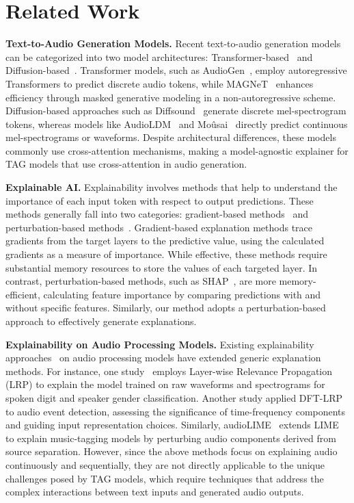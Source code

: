\section{Related Work} \label{sec:related}

\textbf{Text-to-Audio Generation Models.} Recent text-to-audio generation models can be categorized into two model architectures: Transformer-based~\cite{kreuk2022audiogen, ziv2024masked} and Diffusion-based~\cite{yang2023diffsound, liu2023audioldm, schneider2023mo}. Transformer models, such as AudioGen~\cite{kreuk2022audiogen}, employ autoregressive Transformers to predict discrete audio tokens, while MAGNeT~\cite{ziv2024masked} enhances efficiency through masked generative modeling in a non-autoregressive scheme. Diffusion-based approaches such as Diffsound~\cite{yang2023diffsound} generate discrete mel-spectrogram tokens, whereas models like AudioLDM~\cite{liu2023audioldm} and Moûsai~\cite{schneider2023mo} directly predict continuous mel-spectrograms or waveforms. Despite architectural differences, these models commonly use cross-attention mechanisms, making \mname{} a model-agnostic explainer for TAG models that use cross-attention in audio generation.

\textbf{Explainable AI.}  Explainability involves methods that help to understand the importance of each input token with respect to output predictions. These methods generally fall into two categories: gradient-based methods~\cite{selvaraju2017grad, sundararajan2017axiomatic, nagahisarchoghaei2023empirical} and perturbation-based methods~\cite{ribeiro2016should, lundberg2017unified}. Gradient-based explanation methods trace gradients from the target layers to the predictive value, using the calculated gradients as a measure of importance. While effective, these methods require substantial memory resources to store the values of each targeted layer. In contrast, perturbation-based methods, such as SHAP~\cite{lundberg2017unified}, are more memory-efficient, calculating feature importance by comparing predictions with and without specific features. Similarly, our method adopts a perturbation-based approach to effectively generate explanations.

\textbf{Explainability on Audio Processing Models.} Existing explainability approaches~\cite{akman2024audio} on audio processing models have extended generic explanation methods. For instance, one study~\cite{becker2018interpreting} employs Layer-wise Relevance Propagation (LRP) to explain the model trained on raw waveforms and spectrograms for spoken digit and speaker gender classification. Another study applied DFT-LRP~\cite{frommholz2023xai} to audio event detection, assessing the significance of time-frequency components and guiding input representation choices. Similarly, audioLIME~\cite{haunschmid2020audiolime} extends LIME~\cite{ribeiro2016should} to explain music-tagging models by perturbing audio components derived from source separation. However, since the above methods focus on explaining audio continuously and sequentially, they are not directly applicable to the unique challenges posed by TAG models, which require techniques that address the complex interactions between text inputs and generated audio outputs.

